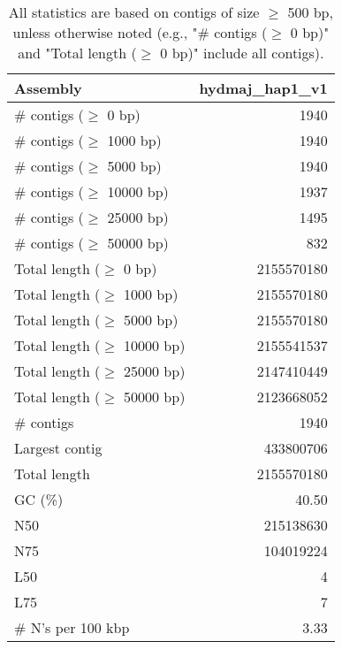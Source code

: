 \documentclass[12pt,a4paper]{article}
\begin{document}
\begin{table}[ht]
\begin{center}
\caption{All statistics are based on contigs of size $\geq$ 500 bp, unless otherwise noted (e.g., "\# contigs ($\geq$ 0 bp)" and "Total length ($\geq$ 0 bp)" include all contigs).}
\begin{tabular}{|l*{1}{|r}|}
\hline
Assembly & hydmaj\_hap1\_v1 \\ \hline
\# contigs ($\geq$ 0 bp) & 1940 \\ \hline
\# contigs ($\geq$ 1000 bp) & 1940 \\ \hline
\# contigs ($\geq$ 5000 bp) & 1940 \\ \hline
\# contigs ($\geq$ 10000 bp) & 1937 \\ \hline
\# contigs ($\geq$ 25000 bp) & 1495 \\ \hline
\# contigs ($\geq$ 50000 bp) & 832 \\ \hline
Total length ($\geq$ 0 bp) & 2155570180 \\ \hline
Total length ($\geq$ 1000 bp) & 2155570180 \\ \hline
Total length ($\geq$ 5000 bp) & 2155570180 \\ \hline
Total length ($\geq$ 10000 bp) & 2155541537 \\ \hline
Total length ($\geq$ 25000 bp) & 2147410449 \\ \hline
Total length ($\geq$ 50000 bp) & 2123668052 \\ \hline
\# contigs & 1940 \\ \hline
Largest contig & 433800706 \\ \hline
Total length & 2155570180 \\ \hline
GC (\%) & 40.50 \\ \hline
N50 & 215138630 \\ \hline
N75 & 104019224 \\ \hline
L50 & 4 \\ \hline
L75 & 7 \\ \hline
\# N's per 100 kbp & 3.33 \\ \hline
\end{tabular}
\end{center}
\end{table}
\end{document}
